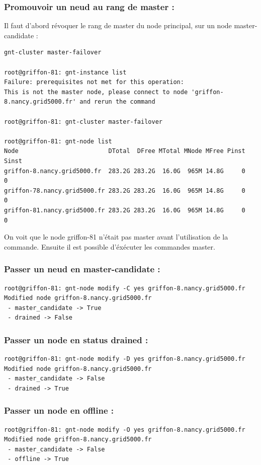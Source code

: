 \subsubsection {Promouvoir un neud au rang de master :}

Il faut d'abord révoquer le rang de master du node principal, sur un node master-candidate :
\begin{lstlisting}
gnt-cluster master-failover

root@griffon-81: gnt-instance list
Failure: prerequisites not met for this operation:
This is not the master node, please connect to node 'griffon-8.nancy.grid5000.fr' and rerun the command

root@griffon-81: gnt-cluster master-failover

root@griffon-81: gnt-node list
Node                         DTotal  DFree MTotal MNode MFree Pinst Sinst
griffon-8.nancy.grid5000.fr  283.2G 283.2G  16.0G  965M 14.8G     0     0
griffon-78.nancy.grid5000.fr 283.2G 283.2G  16.0G  965M 14.8G     0     0
griffon-81.nancy.grid5000.fr 283.2G 283.2G  16.0G  965M 14.8G     0     0
\end{lstlisting}
On voit que le node griffon-81 n'était pas master avant l'utilisation de la commande. Ensuite il est possible d'éxécuter les commandes master.

\subsubsection {Passer un neud en master-candidate :}
\begin{lstlisting}
root@griffon-81: gnt-node modify -C yes griffon-8.nancy.grid5000.fr
Modified node griffon-8.nancy.grid5000.fr
 - master_candidate -> True
 - drained -> False
\end{lstlisting}
\subsubsection {Passer un node en status drained :}
\begin{lstlisting}
root@griffon-81: gnt-node modify -D yes griffon-8.nancy.grid5000.fr
Modified node griffon-8.nancy.grid5000.fr
 - master_candidate -> False
 - drained -> True
\end{lstlisting}
\subsubsection {Passer un node en offline :}
\begin{lstlisting}
root@griffon-81: gnt-node modify -O yes griffon-8.nancy.grid5000.fr
Modified node griffon-8.nancy.grid5000.fr
 - master_candidate -> False
 - offline -> True
\end{lstlisting}
